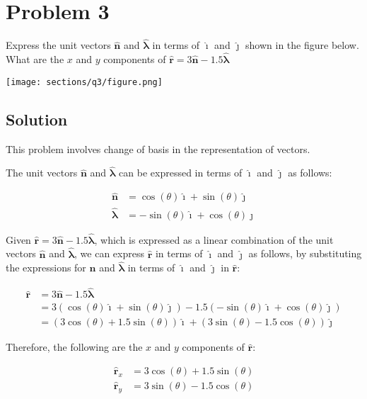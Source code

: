 \section*{Problem 3}

Express the unit vectors \( \mathbf{\hat{n}} \) and \( \mathbf{\hat{\lambda}} \) in terms of \( \mathbf{\hat{\imath}} \) and \( \mathbf{\hat{\jmath}} \) shown in the figure below.
What are the \( x \) and \( y \) components of \( \mathbf{\hat{r}} = 3\mathbf{\hat{n}} - 1.5\mathbf{\hat{\lambda}} \)

\begin{figure*}[h]
    \centering
    \texttt{[image: sections/q3/figure.png]}
\end{figure*}

\subsection*{Solution}

This problem involves change of basis in the representation of vectors.

The unit vectors \( \mathbf{\hat{n}} \) and \( \mathbf{\hat{\lambda}} \) can be expressed in terms of \( \mathbf{\hat{\imath}} \) and \( \mathbf{\hat{\jmath}} \) as follows:

\[
    \begin{aligned}
        \mathbf{\hat{n}}       & = \cos(\theta) \mathbf{\hat{\imath}}  + \sin(\theta) \mathbf{\hat{\jmath}} \\
        \mathbf{\hat{\lambda}} & = -\sin(\theta) \mathbf{\hat{\imath}} + \cos(\theta) \mathbf{\hat{\jmath}}
    \end{aligned}
\]

Given \( \mathbf{\hat{r}} = 3\mathbf{\hat{n}} - 1.5\mathbf{\hat{\lambda}} \), which is expressed as a linear combination of the unit vectors \( \mathbf{\hat{n}} \) and \( \mathbf{\hat{\lambda}} \), we can express \( \mathbf{\hat{r}} \) in terms of \( \mathbf{\hat{\imath}} \) and \( \mathbf{\hat{\jmath}} \) as follows, by substituting the expressions for \( \mathbf{\hat{n}} \) and \( \mathbf{\hat{\lambda}} \) in terms of \( \mathbf{\hat{\imath}} \) and \( \mathbf{\hat{\jmath}} \) in \( \mathbf{\hat{r}} \):

\[
    \begin{aligned}
        \mathbf{\hat{r}} & = 3\mathbf{\hat{n}} - 1.5\mathbf{\hat{\lambda}}                                                                                                              \\
                         & = 3(\cos(\theta) \mathbf{\hat{\imath}} + \sin(\theta) \mathbf{\hat{\jmath}}) - 1.5(-\sin(\theta) \mathbf{\hat{\imath}} + \cos(\theta) \mathbf{\hat{\jmath}}) \\
                         & = (3\cos(\theta) + 1.5\sin(\theta))\mathbf{\hat{\imath}} + (3\sin(\theta) - 1.5\cos(\theta))\mathbf{\hat{\jmath}}
    \end{aligned}
\]

Therefore, the following are the \( x \) and \( y \) components of \( \mathbf{\hat{r}} \):

\[
    \begin{aligned}
        \mathbf{\hat{r}}_x & = 3\cos(\theta) + 1.5\sin(\theta) \\
        \mathbf{\hat{r}}_y & = 3\sin(\theta) - 1.5\cos(\theta)
    \end{aligned}
\]
